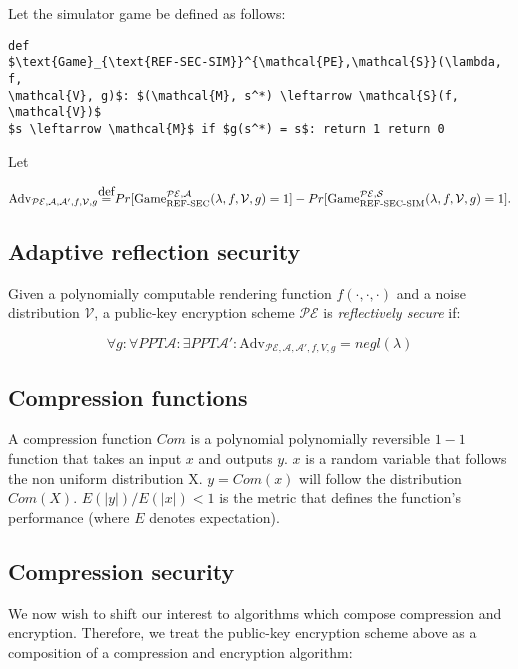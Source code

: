 \documentclass{article} \usepackage[utf8]{inputenc}
\newcommand\defeq{\stackrel{\mathclap{\normalfont\mbox{def}}}{=}}
\begin{document}
Let the simulator game be defined as follows:

\begin{lstlisting}[texcl,mathescape] def
$\text{Game}_{\text{REF-SEC-SIM}}^{\mathcal{PE},\mathcal{S}}(\lambda, f,
\mathcal{V}, g)$: $(\mathcal{M}, s^*) \leftarrow \mathcal{S}(f, \mathcal{V})$
$s \leftarrow \mathcal{M}$ if $g(s^*) = s$: return 1 return 0 \end{lstlisting}

Let

\begin{equation*} \text{Adv}_{\mathcal{PE}, \mathcal{A}, \mathcal{A}', f,
\mathcal{V}, g} \defeq
Pr[\text{Game}_{\text{REF-SEC}}^{\mathcal{PE},\mathcal{A}}(\lambda, f,
\mathcal{V}, g) = 1] -
Pr[\text{Game}_{\text{REF-SEC-SIM}}^{\mathcal{PE},\mathcal{S}}(\lambda, f,
\mathcal{V}, g) = 1].  \end{equation*}

\subsection*{Adaptive reflection security}

Given a polynomially computable rendering function $f(\cdot, \cdot, \cdot)$ and
a  noise distribution $\mathcal{V}$, a public-key encryption scheme
$\mathcal{PE}$ is \textit{reflectively secure} if:

\begin{equation*} \forall g: \forall PPT \mathcal{A}: \exists PPT \mathcal{A}':
\text{Adv}_{\mathcal{PE}, \mathcal{A}, \mathcal{A}', f, V, g} = negl(\lambda)
\end{equation*}

\subsection*{Compression functions} A compression function $Com$ is a
polynomial polynomially reversible $1 - 1$ function that takes an input $x$ and
outputs $y$. $x$ is a random variable that follows the non uniform distribution
X. $y = Com(x)$ will follow the distribution $Com(X)$.  $E(|y|) / E(|x|) < 1$
is the metric that defines the function's performance (where $E$ denotes
expectation).

\subsection*{Compression security}

We now wish to shift our interest to algorithms which compose compression and
encryption.  Therefore, we treat the public-key encryption scheme above as a
composition of a compression and encryption algorithm:
\end{document}

